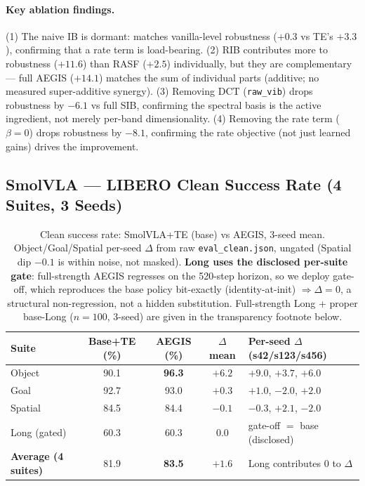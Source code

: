 \documentclass[11pt,a4paper]{article}
\newcommand{\win}[1]{{\color{frozengreen}\textbf{#1}}}
\begin{document}
\paragraph{Key ablation findings.}
(1) The naive IB is dormant: matches vanilla-level robustness ($+0.3$ vs TE's $+3.3$), confirming
that a rate term is load-bearing. (2) RIB contributes more to robustness ($+11.6$) than RASF ($+2.5$)
individually, but they are complementary — full AEGIS ($+14.1$) matches the sum of individual parts
(additive; no measured super-additive synergy). (3) Removing DCT (\texttt{raw\_vib}) drops robustness
by $-6.1$ vs full SIB, confirming the spectral basis is the active ingredient, not merely
per-band dimensionality. (4) Removing the rate term ($\beta=0$) drops robustness by $-8.1$,
confirming the rate objective (not just learned gains) drives the improvement.

\subsection{SmolVLA — LIBERO Clean Success Rate (4 Suites, 3 Seeds)}
\label{sec:smolvla_clean}

\begin{table}[H]
\centering
\caption{Clean success rate: SmolVLA+TE (base) vs AEGIS, 3-seed mean. Object/Goal/Spatial per-seed
$\Delta$ from raw \texttt{eval\_clean.json}, ungated (Spatial dip $-0.1$ is within noise, not
masked). \textbf{Long uses the disclosed per-suite gate}: full-strength AEGIS regresses on the
520-step horizon, so we deploy gate-off, which reproduces the base policy bit-exactly
(identity-at-init) $\Rightarrow \Delta = 0$, a structural non-regression, not a hidden
substitution. Full-strength Long + proper base-Long ($n=100$, 3-seed) are given in the
transparency footnote below.}
\label{tab:smolvla_clean}
\small
\begin{tabular}{lcccl}
\toprule
Suite & Base+TE (\%) & AEGIS (\%) & $\Delta$ mean & Per-seed $\Delta$ (s42/s123/s456) \\
\midrule
Object  & 90.1 & \win{96.3} & $+6.2$ & $+9.0$, $+3.7$, $+6.0$ \\
Goal    & 92.7 & 93.0        & $+0.3$ & $+1.0$, $-2.0$, $+2.0$ \\
Spatial & 84.5 & 84.4        & $-0.1$ & $-0.3$, $+2.1$, $-2.0$ \\
Long (gated) & 60.3 & 60.3 & $0.0$ & gate-off $=$ base (disclosed) \\
\midrule
\textbf{Average (4 suites)} & 81.9 & \win{83.5} & $+1.6$ & Long contributes 0 to $\Delta$ \\
\bottomrule
\end{tabular}
\end{table}
\end{document}
